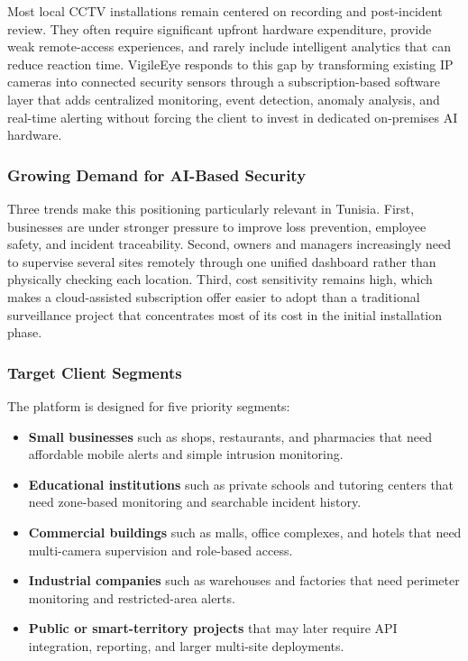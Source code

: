 \documentclass[12pt,a4paper,oneside]{report}
\begin{document}
\hspace{0.8cm}Most local CCTV installations remain centered on recording and post-incident review. They often require significant upfront hardware expenditure, provide weak remote-access experiences, and rarely include intelligent analytics that can reduce reaction time. VigileEye responds to this gap by transforming existing IP cameras into connected security sensors through a subscription-based software layer that adds centralized monitoring, event detection, anomaly analysis, and real-time alerting without forcing the client to invest in dedicated on-premises AI hardware.

\subsubsection{Growing Demand for AI-Based Security}
\hspace{0.8cm}Three trends make this positioning particularly relevant in Tunisia. First, businesses are under stronger pressure to improve loss prevention, employee safety, and incident traceability. Second, owners and managers increasingly need to supervise several sites remotely through one unified dashboard rather than physically checking each location. Third, cost sensitivity remains high, which makes a cloud-assisted subscription offer easier to adopt than a traditional surveillance project that concentrates most of its cost in the initial installation phase.

\subsubsection{Target Client Segments}
\hspace{0.8cm}The platform is designed for five priority segments:
\begin{itemize}
  \item \textbf{Small businesses} such as shops, restaurants, and pharmacies that need affordable mobile alerts and simple intrusion monitoring.
  \item \textbf{Educational institutions} such as private schools and tutoring centers that need zone-based monitoring and searchable incident history.
  \item \textbf{Commercial buildings} such as malls, office complexes, and hotels that need multi-camera supervision and role-based access.
  \item \textbf{Industrial companies} such as warehouses and factories that need perimeter monitoring and restricted-area alerts.
  \item \textbf{Public or smart-territory projects} that may later require API integration, reporting, and larger multi-site deployments.
\end{itemize}
\end{document}
